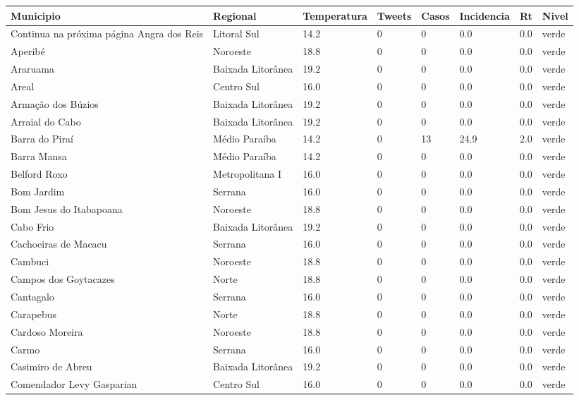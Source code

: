\begin{longtable}{l|lllllll}
  \hline
Municipio & Regional & Temperatura & Tweets & Casos & Incidencia & Rt & Nivel \\ 
  \hline
\endhead
\hline
{\footnotesize Continua na próxima página}
\endfoot
\endlastfoot
Angra dos Reis & Litoral Sul & 14.2 & 0 & 0 & 0.0 & 0.0 & verde \\ 
  Aperibé & Noroeste & 18.8 & 0 & 0 & 0.0 & 0.0 & verde \\ 
  Araruama & Baixada Litorânea & 19.2 & 0 & 0 & 0.0 & 0.0 & verde \\ 
  Areal & Centro Sul & 16.0 & 0 & 0 & 0.0 & 0.0 & verde \\ 
  Armação dos Búzios & Baixada Litorânea & 19.2 & 0 & 0 & 0.0 & 0.0 & verde \\ 
  Arraial do Cabo & Baixada Litorânea & 19.2 & 0 & 0 & 0.0 & 0.0 & verde \\ 
  Barra do Piraí & Médio Paraíba & 14.2 & 0 & 13 & 24.9 & 2.0 & verde \\ 
  Barra Mansa & Médio Paraíba & 14.2 & 0 & 0 & 0.0 & 0.0 & verde \\ 
  Belford Roxo & Metropolitana I & 16.0 & 0 & 0 & 0.0 & 0.0 & verde \\ 
  Bom Jardim & Serrana & 16.0 & 0 & 0 & 0.0 & 0.0 & verde \\ 
  Bom Jesus do Itabapoana & Noroeste & 18.8 & 0 & 0 & 0.0 & 0.0 & verde \\ 
  Cabo Frio & Baixada Litorânea & 19.2 & 0 & 0 & 0.0 & 0.0 & verde \\ 
  Cachoeiras de Macacu & Serrana & 16.0 & 0 & 0 & 0.0 & 0.0 & verde \\ 
  Cambuci & Noroeste & 18.8 & 0 & 0 & 0.0 & 0.0 & verde \\ 
  Campos dos Goytacazes & Norte & 18.8 & 0 & 0 & 0.0 & 0.0 & verde \\ 
  Cantagalo & Serrana & 16.0 & 0 & 0 & 0.0 & 0.0 & verde \\ 
  Carapebus & Norte & 18.8 & 0 & 0 & 0.0 & 0.0 & verde \\ 
  Cardoso Moreira & Noroeste & 18.8 & 0 & 0 & 0.0 & 0.0 & verde \\ 
  Carmo & Serrana & 16.0 & 0 & 0 & 0.0 & 0.0 & verde \\ 
  Casimiro de Abreu & Baixada Litorânea & 19.2 & 0 & 0 & 0.0 & 0.0 & verde \\ 
  Comendador Levy Gasparian & Centro Sul & 16.0 & 0 & 0 & 0.0 & 0.0 & verde \\ 

\end{longtable}
